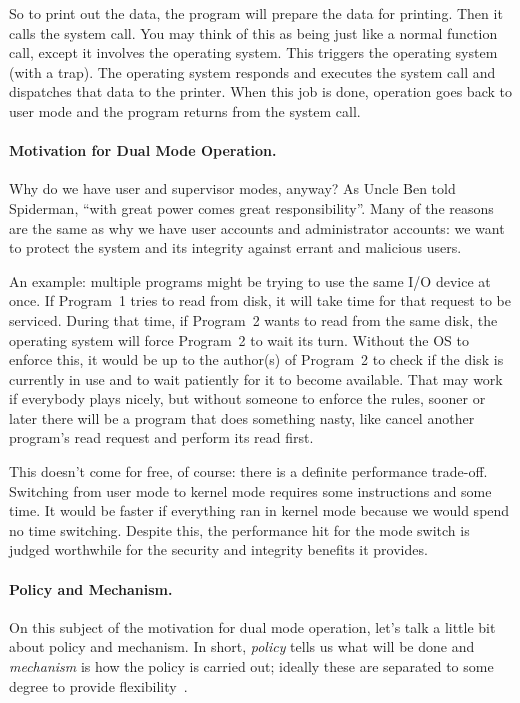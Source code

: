 So to print out the data, the program will prepare the data for printing. Then it calls the system call. You may think of this as being just like a normal function call, except it involves the operating system. This triggers the operating system (with a trap). The operating system responds and executes the system call and dispatches that data to the printer. When this job is done, operation goes back to user mode and the program returns from the system call.

\paragraph{Motivation for Dual Mode Operation.}

Why do we have user and supervisor modes, anyway? As Uncle Ben told Spiderman, ``with great power comes great responsibility''. Many of the reasons are the same as why we have user accounts and administrator accounts: we want to protect the system and its integrity against errant and malicious users.

An example: multiple programs might be trying to use the same I/O device at once. If Program~1 tries to read from disk, it will take time for that request to be serviced. During that time, if Program~2 wants to read from the same disk, the operating system will force Program~2 to wait its turn. Without the OS to enforce this, it would be up to the author(s) of Program~2 to check if the disk is currently in use and to wait patiently for it to become available. That may work if everybody plays nicely, but without someone to enforce the rules, sooner or later there will be a program that does something nasty, like cancel another program's read request and perform its read first.

This doesn't come for free, of course: there is a definite performance trade-off. Switching from user mode to kernel mode requires some instructions and some time. It would be faster if everything ran in kernel mode because we would spend no time switching. Despite this, the performance hit for the mode switch is judged worthwhile for the security and integrity benefits it provides.

\paragraph{Policy and Mechanism.}
On this subject of the motivation for dual mode operation, let's talk a little bit about policy and mechanism. In short, \textit{policy} tells us what will be done and \textit{mechanism} is how the policy is carried out; ideally these are separated to some degree to provide flexibility~\cite{osc}.  

